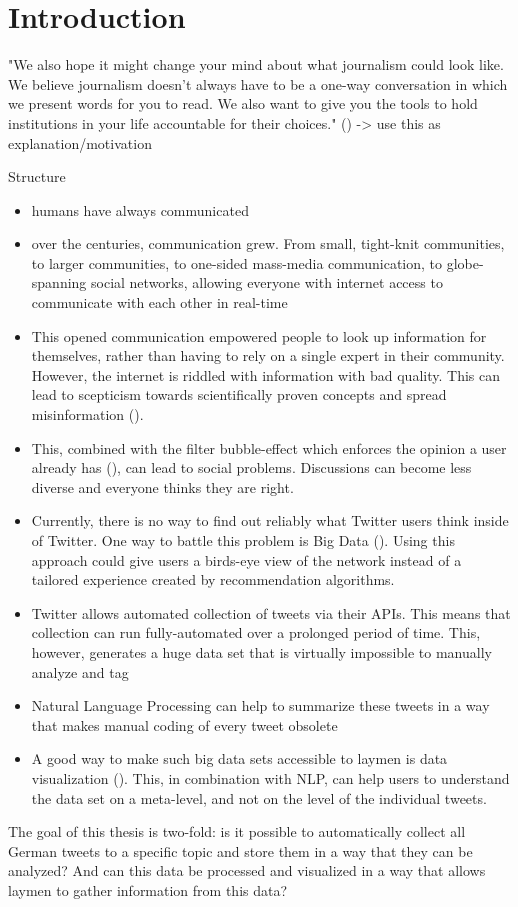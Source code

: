 \section{Introduction}
"We also hope it might change your mind about what journalism could look like. We believe journalism doesn’t always have to be a one-way conversation in which we present words for you to read. We also want to give you the tools to hold institutions in your life accountable for their choices." (\cite{angwinMakingPrivacyPersonal2020}) -> use this as explanation/motivation

Structure
\begin{itemize}
    \item humans have always communicated
    \item over the centuries, communication grew. From small, tight-knit communities, to larger communities, to one-sided mass-media communication, to globe-spanning social networks, allowing everyone with internet access to communicate with each other in real-time
    \item This opened communication empowered people to look up information for themselves, rather than having to rely on a single expert in their community. However, the internet is riddled with information with bad quality. This can lead to scepticism towards scientifically proven concepts and spread misinformation (\cite{krimskyRiskCommunicationInternet2007}).
    \item This, combined with the filter bubble-effect which enforces the opinion a user already has (\cite{pariser2011filter}), can lead to social problems. Discussions can become less diverse and everyone thinks they are right.
    \item Currently, there is no way to find out reliably what Twitter users think inside of Twitter. One way to battle this problem is Big Data (\cite{crawfordCriticalQuestionsBig2012}). Using this approach could give users a birds-eye view of the network instead of a tailored experience created by recommendation algorithms.
    \item Twitter allows automated collection of tweets via their APIs. This means that collection can run fully-automated over a prolonged period of time. This, however, generates a huge data set that is virtually impossible to manually analyze and tag
    \item Natural Language Processing can help to summarize these tweets in a way that makes manual coding of every tweet obsolete
    \item A good way to make such big data sets accessible to laymen is data visualization (\cite{donalekImmersiveCollaborativeData2014}). This, in combination with NLP, can help users to understand the data set on a meta-level, and not on the level of the individual tweets.
\end{itemize}

The goal of this thesis is two-fold: is it possible to automatically collect all German tweets to a specific topic and store them in a way that they can be analyzed? And can this data be processed and visualized in a way that allows laymen to gather information from this data?